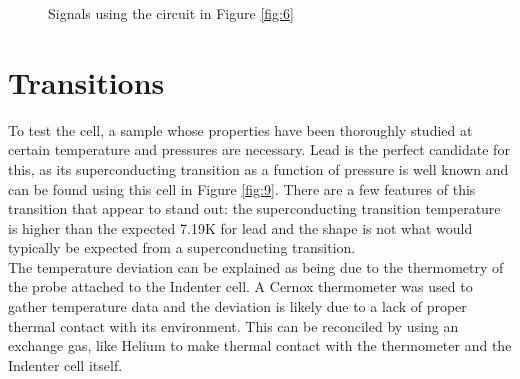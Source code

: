 \documentclass[11pt,onecolumn]{article}
\begin{document}
\begin{figure}[ht]
	\centering
	\hspace{5mm}
	\caption{Signals using the circuit in Figure \ref{fig:6}}
	\label{fig:13}
\end{figure}

\section{Transitions}

To test the cell, a sample whose properties have been thoroughly studied at certain temperature and pressures are necessary. Lead is the perfect candidate for this, as its superconducting transition as a function of pressure is well known and can be found using this cell in Figure \ref{fig:9}. There are a few features of this transition that appear to stand out: the superconducting transition temperature is higher than the expected 7.19K for lead and the shape is not what would typically be expected from a superconducting transition.\cite{lead}\\

The temperature deviation can be explained as being due to the thermometry of the probe attached to the Indenter cell. A Cernox thermometer was used to gather temperature data and the deviation is likely due to a lack of proper thermal contact with its environment. This can be reconciled by using an exchange gas, like Helium to make thermal contact with the thermometer and the Indenter cell itself.
\end{document}
